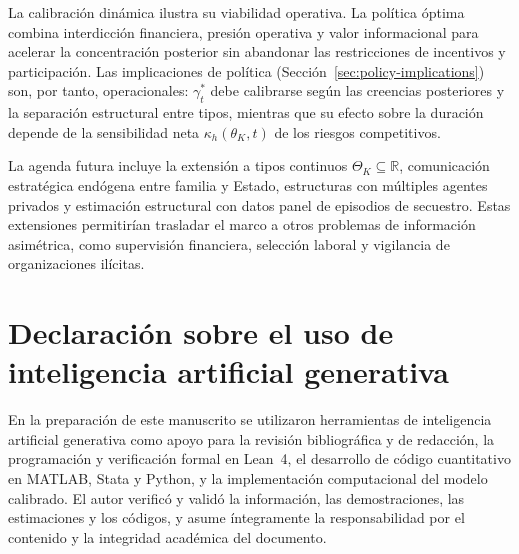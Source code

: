 \documentclass[12pt]{article}
\theoremstyle{definition}
\theoremstyle{remark}
\newcommand{\1}{\mathbf{1}}
\begin{document}
La calibración dinámica ilustra su viabilidad operativa. La política óptima combina interdicción financiera, presión operativa y valor informacional para acelerar la concentración posterior sin abandonar las restricciones de incentivos y participación. Las implicaciones de política (Sección~\ref{sec:policy-implications}) son, por tanto, operacionales: $\gamma_t^\ast$ debe calibrarse según las creencias posteriores y la separación estructural entre tipos, mientras que su efecto sobre la duración depende de la sensibilidad neta $\kappa_h(\theta_K,t)$ de los riesgos competitivos.

La agenda futura incluye la extensión a tipos continuos $\Theta_K\subseteq\mathbb{R}$, comunicación estratégica endógena entre familia y Estado, estructuras con múltiples agentes privados y estimación estructural con datos panel de episodios de secuestro. Estas extensiones permitirían trasladar el marco a otros problemas de información asimétrica, como supervisión financiera, selección laboral y vigilancia de organizaciones ilícitas.

\section*{Declaración sobre el uso de inteligencia artificial generativa}

En la preparación de este manuscrito se utilizaron herramientas de inteligencia artificial generativa como apoyo para la revisión bibliográfica y de redacción, la programación y verificación formal en Lean~4, el desarrollo de código cuantitativo en MATLAB, Stata y Python, y la implementación computacional del modelo calibrado. El autor verificó y validó la información, las demostraciones, las estimaciones y los códigos, y asume íntegramente la responsabilidad por el contenido y la integridad académica del documento.



\end{document}
